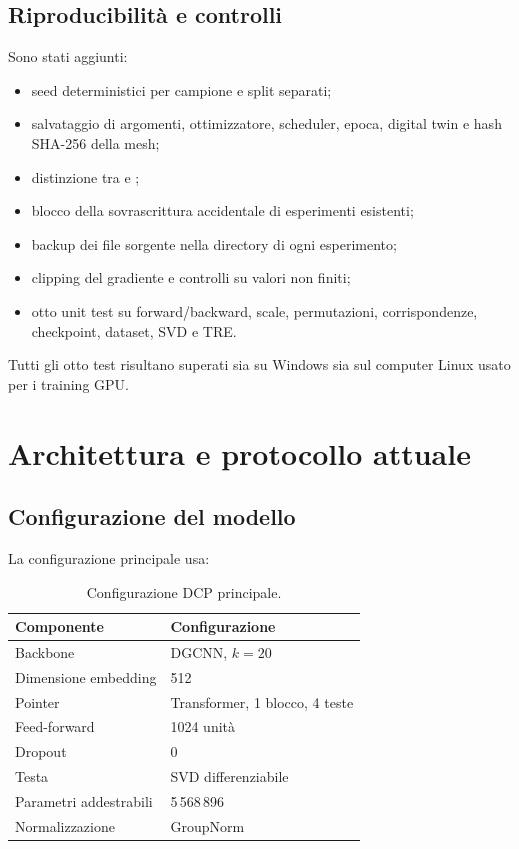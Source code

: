 \documentclass[11pt,a4paper]{article}
\newcommand{\code}[1]{\texttt{\detokenize{#1}}}
\begin{document}
\subsection{Riproducibilità e controlli}

Sono stati aggiunti:

\begin{itemize}
    \item seed deterministici per campione e split separati;
    \item salvataggio di argomenti, ottimizzatore, scheduler, epoca, digital
    twin e hash SHA-256 della mesh;
    \item distinzione tra \code{--resume} e \code{--pretrained};
    \item blocco della sovrascrittura accidentale di esperimenti esistenti;
    \item backup dei file sorgente nella directory di ogni esperimento;
    \item clipping del gradiente e controlli su valori non finiti;
    \item otto unit test su forward/backward, scale, permutazioni,
    corrispondenze, checkpoint, dataset, SVD e TRE.
\end{itemize}

Tutti gli otto test risultano superati sia su Windows sia sul computer Linux
usato per i training GPU.

\section{Architettura e protocollo attuale}

\subsection{Configurazione del modello}

La configurazione principale usa:

\begin{table}[h]
\centering
\caption{Configurazione DCP principale.}
\begin{tabular}{ll}
\toprule
Componente & Configurazione \\
\midrule
Backbone & DGCNN, $k=20$ \\
Dimensione embedding & 512 \\
Pointer & Transformer, 1 blocco, 4 teste \\
Feed-forward & 1024 unità \\
Dropout & 0 \\
Testa & SVD differenziabile \\
Parametri addestrabili & 5\,568\,896 \\
Normalizzazione & GroupNorm \\
\bottomrule
\end{tabular}
\end{table}
\end{document}
